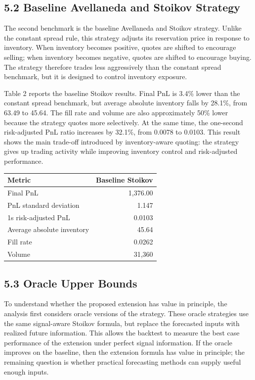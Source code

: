 \documentclass[12pt,a4paper]{article}
\begin{document}
\subsection{5.2 Baseline Avellaneda and Stoikov
Strategy}\label{baseline-avellaneda-and-stoikov-strategy-1}

The second benchmark is the baseline Avellaneda and Stoikov strategy.
Unlike the constant spread rule, this strategy adjusts its reservation
price in response to inventory. When inventory becomes positive, quotes
are shifted to encourage selling; when inventory becomes negative,
quotes are shifted to encourage buying. The strategy therefore trades
less aggressively than the constant spread benchmark, but it is designed
to control inventory exposure.

Table 2 reports the baseline Stoikov results. Final PnL is 3.4\% lower
than the constant spread benchmark, but average absolute inventory falls
by 28.1\%, from 63.49 to 45.64. The fill rate and volume are also
approximately 50\% lower because the strategy quotes more selectively.
At the same time, the one-second risk-adjusted PnL ratio increases by
32.1\%, from 0.0078 to 0.0103. This result shows the main trade-off
introduced by inventory-aware quoting: the strategy gives up trading
activity while improving inventory control and risk-adjusted
performance.

\begingroup\small{}\setlength{\tabcolsep}{4pt}
\begin{longtable}[]{@{}lr@{}}
\toprule\noalign{}
Metric & Baseline Stoikov \\
\midrule\noalign{}
\endhead
\bottomrule\noalign{}
\endlastfoot
Final PnL & 1,376.00 \\
PnL standard deviation & 1.147 \\
1s risk-adjusted PnL & 0.0103 \\
Average absolute inventory & 45.64 \\
Fill rate & 0.0262 \\
Volume & 31,360 \\
\end{longtable}
\endgroup

\subsection{5.3 Oracle Upper Bounds}\label{oracle-upper-bounds}

To understand whether the proposed extension has value in principle, the
analysis first considers oracle versions of the strategy. These oracle
strategies use the same signal-aware Stoikov formula, but replace the
forecasted inputs with realized future information. This allows the
backtest to measure the best case performance of the extension under
perfect signal information. If the oracle improves on the baseline, then
the extension formula has value in principle; the remaining question is
whether practical forecasting methods can supply useful enough inputs.
\end{document}
